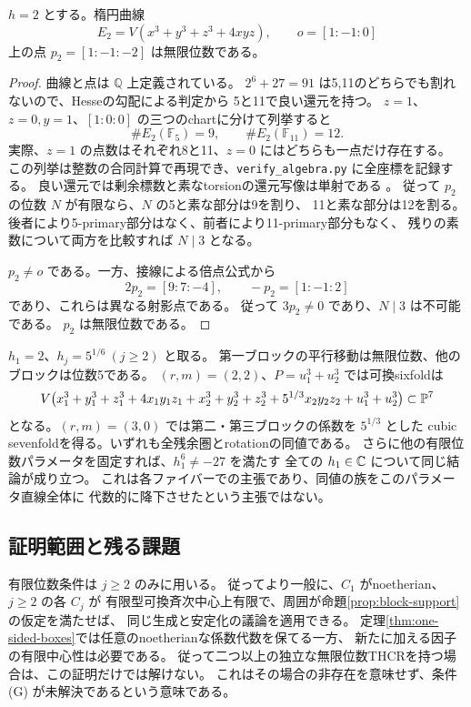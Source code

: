 \begin{lemma}[無限位数の明示的パラメータ]\label{lem:order-infinite}
 \(h=2\) とする。楕円曲線
 \[
 E_2=V(x^3+y^3+z^3+4xyz),\qquad o=[1:-1:0]
 \]
 上の点 \(p_2=[1:-1:-2]\) は無限位数である。
\end{lemma}
\begin{proof}
 曲線と点は \(\mathbb Q\) 上定義されている。
 \(2^6+27=91\) は5,11のどちらでも割れないので、Hesseの勾配による判定から
 5と11で良い還元を持つ。
 \(z=1\)、\(z=0,y=1\)、\([1:0:0]\) の三つのchartに分けて列挙すると
 \[
 \#E_2(\mathbb F_5)=9,\qquad \#E_2(\mathbb F_{11})=12.
 \]
 実際、\(z=1\) の点数はそれぞれ8と11、\(z=0\) にはどちらも一点だけ存在する。
 この列挙は整数の合同計算で再現でき、\texttt{verify\_algebra.py} に全座標を記録する。
 良い還元では剰余標数と素なtorsionの還元写像は単射である
 \cite[Reduction of torsion points]{SnowdenDVR}。
 従って \(p_2\) の位数 \(N\) が有限なら、\(N\) の5と素な部分は9を割り、
 11と素な部分は12を割る。後者により5-primary部分はなく、前者により11-primary部分もなく、
 残りの素数について両方を比較すれば \(N\mid3\) となる。

 \(p_2\ne o\) である。一方、接線による倍点公式から
 \[
 2p_2=[9:7:-4],\qquad -p_2=[1:-1:2]
 \]
 であり、これらは異なる射影点である。
 従って \(3p_2\ne0\) であり、\(N\mid3\) は不可能である。
 \(p_2\) は無限位数である。
\end{proof}

\begin{remark}[真に無限位数を含むsixfoldとsevenfold]
 \(h_1=2\)、\(h_j=5^{1/6}\ (j\ge2)\) と取る。
 第一ブロックの平行移動は無限位数、他のブロックは位数5である。
 \((r,m)=(2,2)\)、\(P=u_1^3+u_2^3\) では可換sixfoldは
 \[
 V\bigl(x_1^3+y_1^3+z_1^3+4x_1y_1z_1
       +x_2^3+y_2^3+z_2^3+5^{1/3}x_2y_2z_2+u_1^3+u_2^3\bigr)
 \subset\mathbb P^7
 \]
 となる。\((r,m)=(3,0)\) では第二・第三ブロックの係数を \(5^{1/3}\) とした
 cubic sevenfoldを得る。いずれも全残余圏とrotationの同値である。
 さらに他の有限位数パラメータを固定すれば、\(h_1^6\ne-27\) を満たす
 全ての \(h_1\in\mathbb C\) について同じ結論が成り立つ。
 これは各ファイバーでの主張であり、同値の族をこのパラメータ直線全体に
 代数的に降下させたという主張ではない。
\end{remark}

\subsection{証明範囲と残る課題}

有限位数条件は \(j\ge2\) のみに用いる。
従ってより一般に、\(C_1\) がnoetherian、\(j\ge2\) の各 \(C_j\) が
有限型可換斉次中心上有限で、周囲が命題\ref{prop:block-support}の仮定を満たせば、
同じ生成と安定化の議論を適用できる。
定理\ref{thm:one-sided-boxes}では任意のnoetherianな係数代数を保てる一方、
新たに加える因子の有限中心性は必要である。
従って二つ以上の独立な無限位数THCRを持つ場合は、この証明だけでは解けない。
これはその場合の非存在を意味せず、条件 (G) が未解決であるという意味である。

